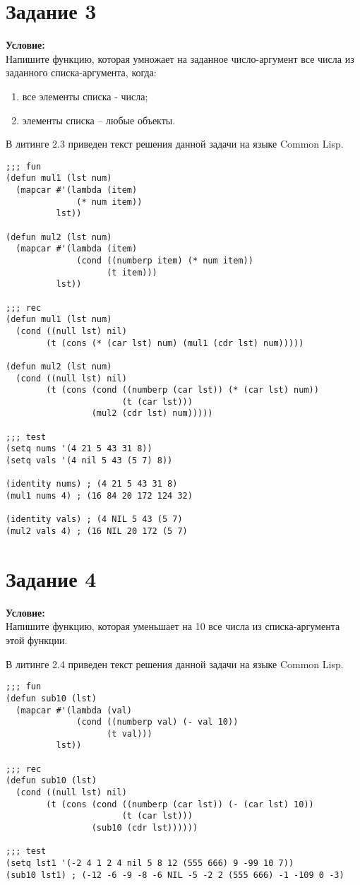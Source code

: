 \section{Задание \No{}3}
\textbf{Условие:}\\Напишите функцию, которая умножает на заданное число-аргумент все числа из заданного списка-аргумента, когда:
\begin{enumerate}
	\item все элементы списка - числа;
	\item элементы списка -- любые объекты.
\end{enumerate}

В литинге 2.3 приведен текст решения данной задачи на языке Common Lisp.

\begin{lstlisting}[caption={Задание \No{}3}]
;;; fun
(defun mul1 (lst num)
  (mapcar #'(lambda (item)
              (* num item))
          lst))

(defun mul2 (lst num)
  (mapcar #'(lambda (item)
              (cond ((numberp item) (* num item))
                    (t item)))
          lst))

;;; rec
(defun mul1 (lst num)
  (cond ((null lst) nil)
        (t (cons (* (car lst) num) (mul1 (cdr lst) num)))))

(defun mul2 (lst num)
  (cond ((null lst) nil)
        (t (cons (cond ((numberp (car lst)) (* (car lst) num))
                       (t (car lst)))
                 (mul2 (cdr lst) num)))))

;;; test
(setq nums '(4 21 5 43 31 8))
(setq vals '(4 nil 5 43 (5 7) 8))

(identity nums) ; (4 21 5 43 31 8)
(mul1 nums 4) ; (16 84 20 172 124 32)

(identity vals) ; (4 NIL 5 43 (5 7)
(mul2 vals 4) ; (16 NIL 20 172 (5 7)
\end{lstlisting}

\section{Задание \No{}4}
\textbf{Условие:}\\Напишите функцию, которая уменьшает на 10 все числа из списка-аргумента этой функции.

В литинге 2.4 приведен текст решения данной задачи на языке Common Lisp.

\begin{lstlisting}[caption={Задание \No{}4}]
;;; fun
(defun sub10 (lst)
  (mapcar #'(lambda (val)
              (cond ((numberp val) (- val 10))
                    (t val)))
          lst))

;;; rec
(defun sub10 (lst)
  (cond ((null lst) nil)
        (t (cons (cond ((numberp (car lst)) (- (car lst) 10))
                       (t (car lst)))
                 (sub10 (cdr lst))))))

;;; test
(setq lst1 '(-2 4 1 2 4 nil 5 8 12 (555 666) 9 -99 10 7))
(sub10 lst1) ; (-12 -6 -9 -8 -6 NIL -5 -2 2 (555 666) -1 -109 0 -3)
\end{lstlisting}

